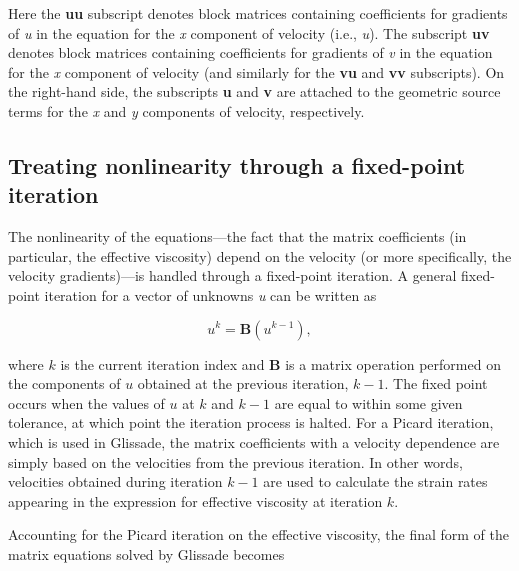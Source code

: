 \noindent
Here the \textbf{uu} subscript denotes block matrices containing coefficients for gradients of \textit{u} in the equation for the \textit{x} component of velocity (i.e., \textit{u}). The subscript \textbf{uv} denotes block matrices containing coefficients for gradients of \textit{v} in the equation for the \textit{x} component of velocity (and similarly for the \textbf{vu} and \textbf{vv} subscripts). On the right-hand side, the subscripts \textbf{u} and \textbf{v} are attached to the geometric source terms for the \textit{x} and \textit{y} components of velocity, respectively.

\subsection{Treating nonlinearity through a fixed-point iteration}
The nonlinearity of the equations---the fact that the matrix coefficients (in particular, the effective viscosity) depend
on the velocity (or more specifically, the velocity gradients)---is handled through a fixed-point iteration. 
A general fixed-point iteration for a vector of unknowns \textit{u} can be written as 

\begin{equation}
  u^{k} = \mathbf{B}\left( u^{k-1} \right),
\end{equation}

\noindent
where $k$ is the current iteration index and \textbf{B} is a matrix operation performed on the components of $u$ obtained at the previous iteration, $k-1$. The fixed point occurs when the values of $u$ at $k$ and $k-1$ are equal to within some given tolerance, at which point the iteration process is halted. %
For a Picard iteration, which is used in Glissade, the matrix coefficients with a velocity dependence are simply based on the velocities from the previous iteration. In other words, velocities obtained during iteration $k-1$ are used to calculate the strain rates appearing in the expression for effective viscosity at iteration $k$.

Accounting for %
the Picard iteration on the effective viscosity, the final form of the matrix equations solved by Glissade becomes 

